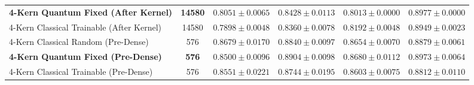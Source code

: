 \documentclass[11pt,a4paper]{article}
\begin{document}
\begin{table}[htbp]
{\begin{tabular}{l c c c c c}
        \textbf{4-Kern Quantum Fixed (After Kernel)} & \textbf{14580}
            & $0.8051 \pm 0.0065$
            & $\bm{0.8428} \pm 0.0113$
            & $0.8013 \pm 0.0000$
            & $\bm{0.8977} \pm 0.0000$ \\
        4-Kern Classical Trainable (After Kernel) & 14580
            & $0.7898 \pm 0.0048$
            & $0.8360 \pm 0.0078$
            & $\bm{0.8192} \pm 0.0048$
            & $0.8949 \pm 0.0023$ \\
        \midrule
        4-Kern Classical Random (Pre-Dense) & 576
            & $\bm{0.8679} \pm 0.0170$
            & $0.8840 \pm 0.0097$
            & $0.8654 \pm 0.0070$
            & $0.8879 \pm 0.0061$ \\
        \textbf{4-Kern Quantum Fixed (Pre-Dense)} & \textbf{576}
            & $0.8500 \pm 0.0096$
            & $\bm{0.8904} \pm 0.0098$
            & $\bm{0.8680} \pm 0.0112$
            & $\bm{0.8973} \pm 0.0064$ \\
        4-Kern Classical Trainable (Pre-Dense) & 576
            & $0.8551 \pm 0.0221$
            & $0.8744 \pm 0.0195$
            & $0.8603 \pm 0.0075$
            & $0.8812 \pm 0.0110$ \\
        \bottomrule
    \end{tabular}
    }
\end{table}
\end{document}
